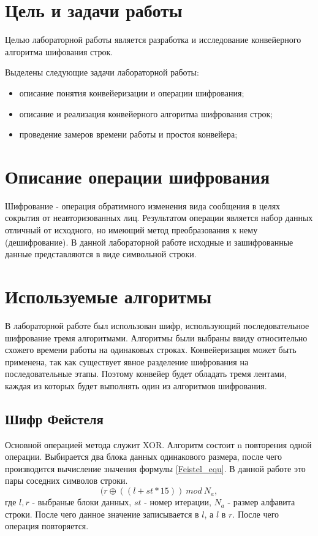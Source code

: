 \section{Цель и задачи работы}
Целью лабораторной работы является разработка и исследование конвейерного алгоритма шифования строк.

Выделены следующие задачи лабораторной работы:

\begin{itemize}
\item описание понятия конвейеризации и операции шифрования;
\item описание и реализация конвейерного алгоритма шифрования строк;
\item проведение замеров времени работы и простоя конвейера;
\end{itemize}

\section{Описание операции шифрования}
Шифрование - операция обратимного изменения вида сообщения в целях сокрытия от неавторизованных лиц. Результатом операции является набор данных отличный от исходного, но имеющий метод преобразования к нему (дешифрование). В данной лабораторной работе исходные и зашифрованные данные представляются в виде символьной строки.

\section{Используемые алгоритмы}
В лабораторной работе был использован шифр, использующий последовательное шифрование тремя алгоритмами\cite{kripto}. Алгоритмы были выбраны ввиду относительно схожего времени работы на одинаковых строках. Конвейеризация может быть применена, так как существует явное разделение шифрования на последовательные этапы. Поэтому конвейер будет обладать тремя лентами, каждая из которых будет выполнять один из алгоритмов шифрования.

\subsection{Шифр Фейстеля}
	Основной операцией метода служит XOR. Алгоритм состоит n повторения одной операции. Выбирается два блока данных одинакового размера, после чего производится вычисление значения формулы \ref{Feistel_equ}. В данной работе это пары соседних символов строки.
	\begin{equation}\label{Feistel_equ}
		(r \oplus ((l + st * 15))\:mod\:N_a,
	\end{equation}
	где 
	$l, r$ - выбраные блоки данных, 
	$st$ - номер итерации, 
	$N_a$ - размер алфавита строки.
	После чего данное значение записывается в $l$, а $l$ в $r$. После чего операция повторяется.

